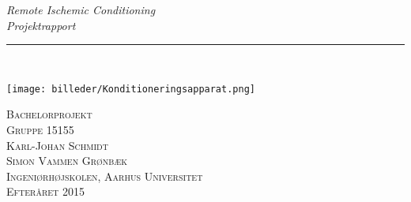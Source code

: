 \thispagestyle{empty}
\begin{flushright}
\vspace{3cm}

\phantom{hul}

\phantom{hul}

\phantom{hul}

\textsl{\Huge Remote Ischemic Conditioning} \\ \vspace{1cm}
\textsl{\Huge Projektrapport} \\ \vspace{1cm}

\rule{\textwidth}{3mm} \\ \vspace{1.5cm}
\vspace{1cm}

\texttt{[image: billeder/Konditioneringsapparat.png]}

\vspace{1cm} 
\textsc{\Large Bachelorprojekt \\
Gruppe 15155 \\
Karl-Johan Schmidt \\
Simon Vammen Grønbæk \\
Ingeniørhøjskolen, Aarhus Universitet \\
Efteråret 2015 \\}
\end{flushright}
